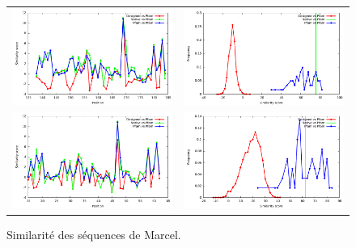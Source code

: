 \documentclass[a4paper,12pt]{article}
\begin{document}
   \begin{figure}[t]
     \centering
     \begin{tabular}{cc}
       \includegraphics[width=8.45cm]{marcel_seq/1CKA/similarity_bypos.pdf} &
       \includegraphics[width=8.45cm]{marcel_seq/1CKA/similarity_byseq_frequency.pdf} \\
       \includegraphics[width=8.45cm]{marcel_seq/1CSK/similarity_bypos.pdf} &
       \includegraphics[width=8.45cm]{marcel_seq/1CSK/similarity_byseq_frequency.pdf} \\

     \end{tabular}

     \caption{Similarité des séquences de Marcel.}

   \end{figure}
\end{document}
